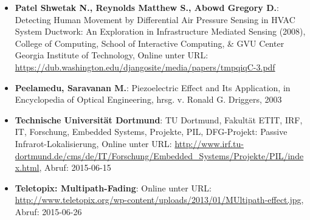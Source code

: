 \begin{itemize}[leftmargin=*]
\item[] \textbf{Patel Shwetak N., Reynolds Matthew S., Abowd Gregory D.}: Detecting Human Movement by Differential Air
Pressure Sensing in HVAC System Ductwork: An Exploration in Infrastructure Mediated Sensing (2008), College of Computing, School of Interactive Computing, \& GVU Center Georgia Institute of Technology, Online unter URL: 
\url{https://dub.washington.edu/djangosite/media/papers/tmpqiqC-3.pdf}
\item[] \textbf{Peelamedu, Saravanan M.}: Piezoelectric Effect and Its Application, in Encyclopedia of Optical Engineering, hrsg. v. Ronald G. Driggers, 2003
\item[] \textbf{Technische Universität Dortmund}: TU Dortmund, Fakultät ETIT, IRF, IT, Forschung, Embedded Systems,  Projekte, PIL, DFG-Projekt: Passive Infrarot-Lokalisierung, Online unter URL: \url{http://www.irf.tu-dortmund.de/cms/de/IT/Forschung/Embedded_Systems/Projekte/PIL/index.html}, Abruf: 2015-06-15
\item[] \textbf{Teletopix: Multipath-Fading}: Online unter URL: \url{http://www.teletopix.org/wp-content/uploads/2013/01/MUltipath-effect.jpg}, Abruf: 2015-06-26
\end{itemize}
